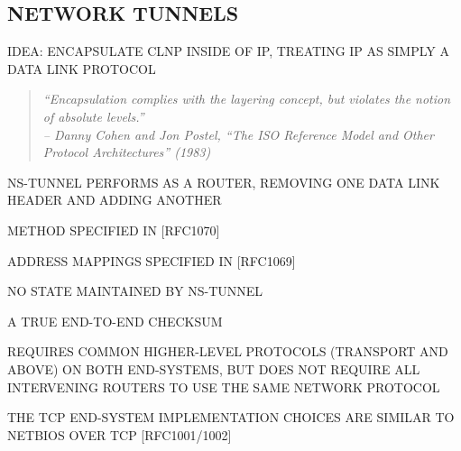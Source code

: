 \begin{bwslide}
\part*	{NETWORK TUNNELS}\bf

\begin{nrtc}
\item	IDEA: ENCAPSULATE CLNP INSIDE OF IP, TREATING IP AS SIMPLY A DATA LINK
	PROTOCOL
\begin{quote}\em
``Encapsulation complies with the layering concept, but violates the notion
of absolute levels.''\\ \raggedleft
-- Danny Cohen and Jon Postel, ``The ISO Reference Model and Other Protocol
Architectures'' (1983)
\end{quote}

\item	NS-TUNNEL PERFORMS AS A ROUTER, REMOVING ONE DATA LINK HEADER AND
	ADDING ANOTHER

\item	METHOD SPECIFIED IN [RFC1070]

\item	ADDRESS MAPPINGS SPECIFIED IN [RFC1069] 
\end{nrtc}
\end{bwslide}






\begin{bwslide}

\begin{nrtc}
\item	NO STATE MAINTAINED BY NS-TUNNEL

\item	A TRUE END-TO-END CHECKSUM
\end{nrtc}
\end{bwslide}


\begin{bwslide}

\begin{nrtc}
\item	REQUIRES COMMON HIGHER-LEVEL PROTOCOLS (TRANSPORT AND ABOVE) ON BOTH
	END-SYSTEMS, BUT DOES NOT REQUIRE ALL INTERVENING ROUTERS TO USE THE
	SAME NETWORK PROTOCOL

\item	THE TCP END-SYSTEM IMPLEMENTATION CHOICES ARE SIMILAR TO NETBIOS OVER
	TCP [RFC1001/1002]
\end{nrtc}
\end{bwslide}



